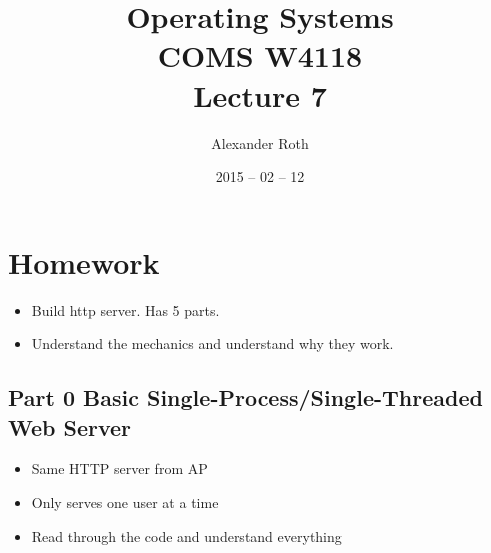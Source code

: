 \documentclass[]{article}
\begin{document}
\newcommand{\code}{\texttt}
\newtheorem{thm}{Theorem}
\title{Operating Systems \\ COMS W4118 \\ Lecture 7}
\author{Alexander Roth}
\date{2015 -- 02 -- 12}
\maketitle

\section{Homework}
\begin{itemize}
\item Build http server. Has 5 parts.
\item Understand the mechanics and understand why they work.
\end{itemize}

\subsection{Part 0 Basic Single-Process/Single-Threaded Web Server}
\begin{itemize}
\item Same HTTP server from AP
\item Only serves one user at a time
\item Read through the code and understand everything
\end{itemize}
\end{document}
